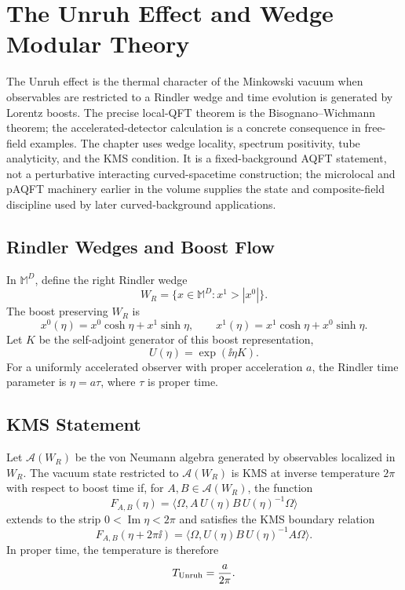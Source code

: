 \chapter{The Unruh Effect and Wedge Modular Theory}
\label{ch:curved-unruh-effect-modular-theory}

\ConventionsLorentzian

The Unruh effect is the thermal character of the Minkowski vacuum when
observables are restricted to a Rindler wedge and time evolution is generated
by Lorentz boosts.  The precise local-QFT theorem is the
Bisognano--Wichmann theorem; the accelerated-detector calculation is a
concrete consequence in free-field examples.
The chapter uses wedge locality, spectrum positivity, tube analyticity, and
the KMS condition.  It is a fixed-background AQFT statement, not a
perturbative interacting curved-spacetime construction; the microlocal and
pAQFT machinery earlier in the volume supplies the state and composite-field
discipline used by later curved-background applications.

\section{Rindler Wedges and Boost Flow}

In \(\mathbb M^D\), define the right Rindler wedge
\[
  W_R=\{x\in\mathbb M^D:x^1>|x^0|\}.
\]
The boost preserving \(W_R\) is
\[
  x^0(\eta)=x^0\cosh\eta+x^1\sinh\eta,\qquad
  x^1(\eta)=x^1\cosh\eta+x^0\sinh\eta .
\]
Let \(K\) be the self-adjoint generator of this boost representation,
\[
  U(\eta)=\exp(\ii\eta K).
\]
For a uniformly accelerated observer with proper acceleration \(a\), the
Rindler time parameter is \(\eta=a\tau\), where \(\tau\) is proper time.

\section{KMS Statement}

Let \(\mathcal A(W_R)\) be the von Neumann algebra generated by observables
localized in \(W_R\).  The vacuum state restricted to \(\mathcal A(W_R)\) is
KMS at inverse temperature \(2\pi\) with respect to boost time if, for
\(A,B\in\mathcal A(W_R)\), the function
\[
  F_{A,B}(\eta)=\langle\Omega,A\,U(\eta)B\,U(\eta)^{-1}\Omega\rangle
\]
extends to the strip \(0<\operatorname{Im}\eta<2\pi\) and satisfies the KMS
boundary relation
\[
  F_{A,B}(\eta+2\pi\ii)
  =
  \langle\Omega,U(\eta)B\,U(\eta)^{-1}A\Omega\rangle .
\]
In proper time, the temperature is therefore
\[
  T_{\rm Unruh}=\frac{a}{2\pi}.
\]

